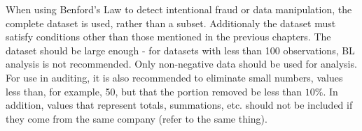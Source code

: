 
When using Benford's Law to detect intentional fraud or data manipulation, the complete dataset is used, rather than a subset. Additionaly the dataset must satisfy conditions other than those mentioned in the previous chapters. The dataset should be large enough - for datasets with less than 100 observations, BL analysis is not recommended. \cite{kossovsky2014benford} %
Only non-negative data should be used for analysis. For use in auditing, it is also recommended to eliminate small numbers, values less than, for example, 50, but that the portion removed be less than $10\%$. In addition, values that represent totals, summations, etc. should not be included if they come from the same company (refer to the same thing). \cite{kossovsky2014benford} %





